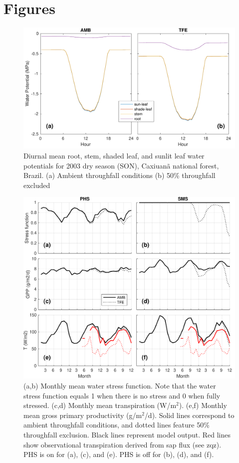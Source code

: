 \documentclass[draft,linenumbers]{agujournal}
\begin{document}
    
\clearpage    

\section{Figures}
  \begin{figure}[h]
     \centering
     \includegraphics[width=30pc]{../figs/fig2.pdf}
     \caption{Diurnal mean root, stem, shaded leaf, and sunlit leaf water potentials for 2003 dry season (SON), Caxiuan\~a national forest, Brazil.
     (a) Ambient throughfall conditions (b) 50\% throughfall excluded
     }
     \label{fig:vwp}
  \end{figure}
  
  \clearpage   
  \begin{figure}[h]
     \centering
     \includegraphics[width=30pc]{../figs/fig3.pdf}
     \caption{(a,b) Monthly mean water stress function. Note that the water stress function equals 1 when there is no stress and 0 when fully stressed.
     (c,d) Monthly mean transpiration (W/m$^2$).
     (e,f) Monthly mean gross primary productivity (g/m$^2$/d). 
     Solid lines correspond to ambient throughfall conditions, and dotted lines feature 50\% throughfall exclusion.
     Black lines represent model output.
     Red lines show observational transpiration derived from sap flux (see zqz).
     PHS is on for (a), (c), and (e). PHS is off for (b), (d), and (f).
     }
     \label{fig:mm}
  \end{figure}
  
\end{document}
